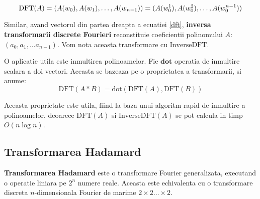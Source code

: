 \begin{equation}
  \label{dft}
  \text{DFT}(A) = (A(w_{0}), A(w_{1}), \ldots, A(w_{n-1})) \\
                = (A(w_{0}^{1}), A(w_{0}^{2}), \ldots, A(w_{0}^{n-1}))
\end{equation}

Similar, avand vectorul din partea dreapta a ecuatiei \ref{dft}, \textbf{inversa
transformarii discrete Fourieri} reconstituie coeficientii polinomului $A$:
$(a_{0}, a_{1}, \ldots a_{n-1})$. Vom nota aceasta transformare cu
$\text{InverseDFT}$. \par

O aplicatie utila este inmultirea polinoamelor. Fie $\textbf{dot}$ operatia de
inmultire scalara a doi vectori. Aceasta se bazeaza pe o
proprietatea a transformarii, si anume:
\begin{equation}
  \text{DFT}(A * B) = \text{dot}(\text{DFT}(A), \text{DFT}(B))
\end{equation}

Aceasta proprietate este utila, fiind la baza unui algoritm rapid de inmultire a
polinoamelor, deoarece $\text{DFT}(A)$ si $\text{InverseDFT}(A)$ se pot calcula
in timp $O(n \log n)$.

\subsection{Transformarea Hadamard}

\textbf{Transformarea Hadamard} este o transformare Fourier generalizata,
executand o operatie liniara pe $2^{n}$ numere reale. Aceasta este echivalenta
cu o transformare discreta $n$-dimensionala Fourier de marime
$2 \times 2 \ldots \times 2$.
